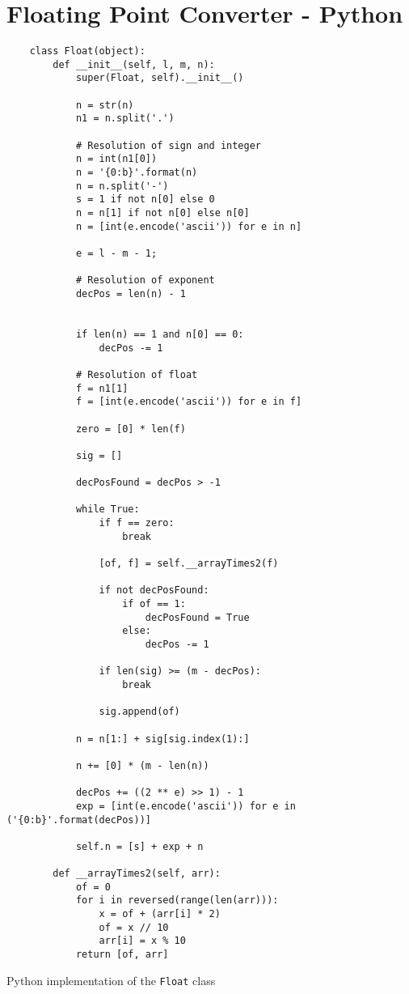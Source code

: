 \chapter{Floating Point Converter - Python}
\begin{code}
    \begin{verbatim}
    class Float(object):
    	def __init__(self, l, m, n):
    		super(Float, self).__init__()
    
    		n = str(n)
    		n1 = n.split('.')
    
    		# Resolution of sign and integer
    		n = int(n1[0])
    		n = '{0:b}'.format(n)
    		n = n.split('-')
    		s = 1 if not n[0] else 0
    		n = n[1] if not n[0] else n[0]
    		n = [int(e.encode('ascii')) for e in n]
    
    		e = l - m - 1;
    
    		# Resolution of exponent
    		decPos = len(n) - 1
    
    		
    		if len(n) == 1 and n[0] == 0:
    			decPos -= 1
    
    		# Resolution of float
    		f = n1[1]
    		f = [int(e.encode('ascii')) for e in f]
    
    		zero = [0] * len(f)
    
    		sig = []
    
    		decPosFound = decPos > -1
    
    		while True:
    			if f == zero:
    				break
    			
    			[of, f] = self.__arrayTimes2(f)
    
    			if not decPosFound:
    				if of == 1:
    					decPosFound = True
    				else:
    					decPos -= 1
    			
    			if len(sig) >= (m - decPos):
    				break
    
    			sig.append(of)
    
    		n = n[1:] + sig[sig.index(1):]
    
    		n += [0] * (m - len(n))
    		
    		decPos += ((2 ** e) >> 1) - 1
    		exp = [int(e.encode('ascii')) for e in ('{0:b}'.format(decPos))]
    		
    		self.n = [s] + exp + n
    
    	def __arrayTimes2(self, arr):
    		of = 0
    		for i in reversed(range(len(arr))):
    			x = of + (arr[i] * 2)
    			of = x // 10
    			arr[i] = x % 10
    		return [of, arr]
    \end{verbatim}
    \caption{Python implementation of the \texttt{Float} class}
    \label{lst:py_class_float}
\end{code}